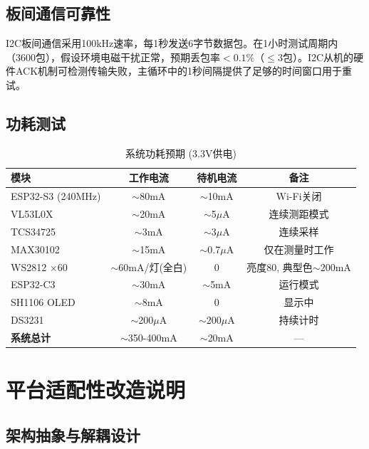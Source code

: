 \documentclass[UTF8,a4paper,12pt]{ctexart}
\begin{document}
\subsection{板间通信可靠性}

I2C板间通信采用100kHz速率，每1秒发送6字节数据包。在1小时测试周期内（3600包），假设环境电磁干扰正常，预期丢包率$<0.1\%$（$\leq$3包）。I2C从机的硬件ACK机制可检测传输失败，主循环中的1秒间隔提供了足够的时间窗口用于重试。

\subsection{功耗测试}

\begin{table}[H]
\centering
\caption{系统功耗预期 (3.3V供电)}
\begin{tabular}{@{}lccc@{}}
\toprule
\textbf{模块} & \textbf{工作电流} & \textbf{待机电流} & \textbf{备注} \\
\midrule
ESP32-S3 (240MHz) & $\sim$80mA & $\sim$10mA & Wi-Fi关闭 \\
VL53L0X & $\sim$20mA & $\sim$5$\mu$A & 连续测距模式 \\
TCS34725 & $\sim$3mA & $\sim$3$\mu$A & 连续采样 \\
MAX30102 & $\sim$15mA & $\sim$0.7$\mu$A & 仅在测量时工作 \\
WS2812 $\times$60 & $\sim$60mA/灯(全白) & 0 & 亮度80, 典型色$\sim$200mA \\
ESP32-C3 & $\sim$30mA & $\sim$5mA & 运行模式 \\
SH1106 OLED & $\sim$8mA & 0 & 显示中 \\
DS3231 & $\sim$200$\mu$A & $\sim$200$\mu$A & 持续计时 \\
\midrule
\textbf{系统总计} & $\sim$350-400mA & $\sim$20mA & — \\
\bottomrule
\end{tabular}
\end{table}

\newpage
\section{平台适配性改造说明}

\subsection{架构抽象与解耦设计}
\end{document}
